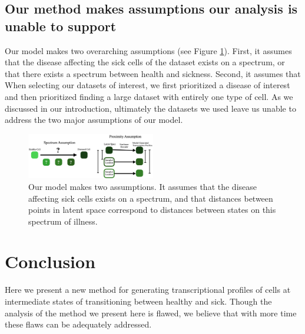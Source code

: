 \documentclass{article}
\begin{document}
\subsection{Our method makes assumptions our analysis is unable to support}
Our model makes two overarching assumptions (see Figure \ref{assumptions}).
First, it assumes that the disease affecting the sick cells of the dataset exists on a spectrum, or that there exists a spectrum between health and sickness.
Second, it assumes that 
When selecting our datasets of interest, we first prioritized a disease of interest and then prioritized finding a large dataset with entirely one type of cell.
As we discussed in our introduction, ultimately the datasets we used leave us unable to address the two major assumptions of our model.

\begin{figure}
  \centering
  \includegraphics[width=0.5\textwidth]{assumptions.jpg}
  \caption{Our model makes two assumptions.
  It assumes that the disease affecting sick cells exists on a spectrum, and that distances between points in latent space correspond to distances between states on this spectrum of illness.}
  \label{assumptions}
\end{figure}

\section{Conclusion}
Here we present a new method for generating transcriptional profiles of cells at intermediate states of transitioning between healthy and sick.
Though the analysis of the method we present here is flawed, we believe that with more time these flaws can be adequately addressed.



{
\small
\printbibliography
}
\end{document}

